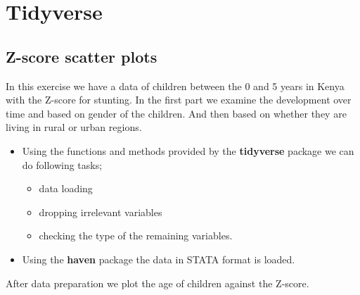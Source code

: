 \chapter{Tidyverse}
\section{Z-score scatter plots}

In this exercise we have a data of children between the 0 and 5 years in Kenya with the Z-score for stunting. In the first part we examine the development over time and based on gender of the children. And then based on whether they are living in rural or urban regions.

\begin{itemize}
    \item Using the functions and methods provided by the \textbf{tidyverse} package we can do following tasks;
    \begin{itemize}
        \item data loading
        \item dropping irrelevant variables
        \item checking the type of the remaining variables. 
    \end{itemize}
    \item Using the \textbf{haven} package the data in STATA format is loaded. 
\end{itemize}

\nonumber
After data preparation we plot the age of children against the Z-score.%


